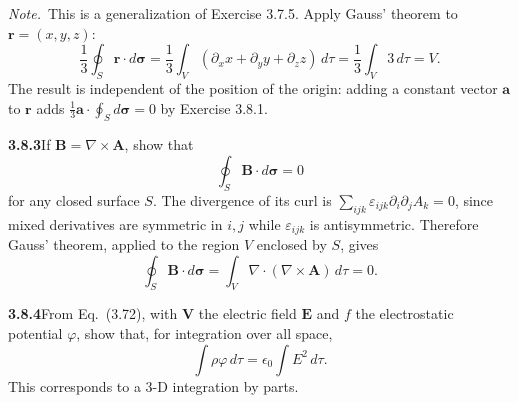 \emph{Note.}~This is a generalization of Exercise 3.7.5.
\solution
Apply Gauss' theorem to $\mathbf r=(x,y,z)$:
\[
\frac13\oint_S\mathbf r\cdot d\boldsymbol\sigma
=\frac13\int_V(\partial_xx+\partial_yy+\partial_zz)\,d\tau
=\frac13\int_V3\,d\tau=\boxed V.
\]
The result is independent of the position of the origin: adding a
constant vector $\mathbf a$ to $\mathbf r$ adds
$\frac13\mathbf a\cdot\oint_Sd\boldsymbol\sigma=0$ by Exercise 3.8.1.

\par\bigskip
\noindent\textbf{3.8.3}\quad If $\mathbf{B}=\nabla\times\mathbf{A}$, show that
\[
\oint_{S}\mathbf{B}\cdot d\boldsymbol{\sigma}=0
\]
for any closed surface $S$.
\solution
{}
The divergence of its curl is
$\sum_{ijk}\varepsilon_{ijk}\partial_i\partial_jA_k=0$, since mixed
derivatives are symmetric in $i,j$ while $\varepsilon_{ijk}$ is
antisymmetric. Therefore Gauss' theorem, applied to the region $V$
enclosed by $S$, gives
\[
\boxed{\oint_S\mathbf B\cdot d\boldsymbol\sigma
=\int_V\nabla\cdot(\nabla\times\mathbf A)\,d\tau=0}.
\]

\par\bigskip
\noindent\textbf{3.8.4}\quad From Eq.~(3.72), with $\mathbf{V}$ the electric
field $\mathbf{E}$ and $f$ the electrostatic potential $\varphi$, show that,
for integration over all space,
\[
\int\rho\varphi\,d\tau=\epsilon_{0}\int E^{2}\,d\tau.
\]
This corresponds to a 3-D integration by parts.

